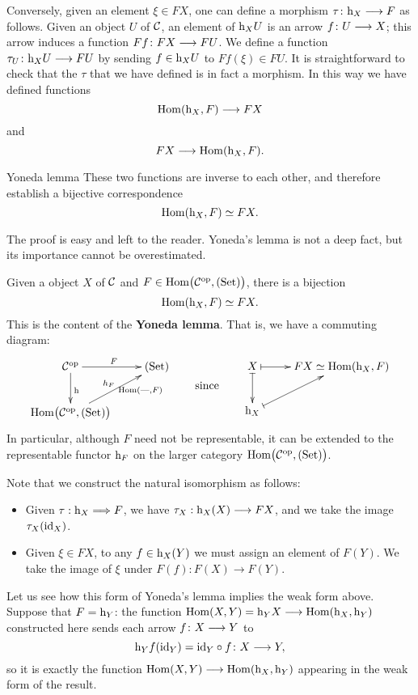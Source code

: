 \begin{2   CONTRAVARIANT FUNCTORS}
\begin{2.1 Yoneda Lemma}
Conversely, given an element $\xi\in F X$, one can define a morphism $\tau\colon \h_X \arr F$ as follows. Given an object $U$ of $\mathcal{C}$, an element of $\mathrm{h}_X U$ is an arrow $f\colon U \arr X$; this arrow induces a function $F f \colon F X \arr F U$. We define a function $\tau_{U} \colon \h_X U \arr F U$ by sending $f \in \mathrm{h}_X U$ to $F f(\xi) \in F U$. It is straightforward to check that the $\tau$ that we have defined is in fact a morphism. In this way we have defined functions
   \[
   \hom(\h_X,F) \arr F X
   \]
and
   \[
   F X \arr \hom(\h_X,F).
   \]

\begin{named}{Yoneda lemma}
These two functions are inverse to each other, and therefore establish a bijective correspondence
   \[
   \operatorname{Hom}(\mathrm{h}_X,F) \simeq F X.
   \]
\end{named}

The proof is easy and left to the reader. Yoneda's lemma is not a deep fact, but its importance cannot be overestimated.
\begin{shaded}
Given a object $X$ of $\mathcal{C}$ and $F\in\mathrm{Hom}\bigl(\mathcal{C}^{\mathrm{op}}, (\mathrm{Set})\bigr)$, there is a bijection
\[\operatorname{Hom}(\mathrm{h}_X,F)\simeq FX.\]
This is the content of the \textbf{Yoneda lemma}. That is, we have a commuting diagram:
\[\xymatrix{
\ar[d]^{\h}\calC\op\ar[r]^F&\catset\\
\func{\calC}\ar[ur]^{h_F}_(.65){\hom(\DASH,F)}&
}\raisebox{-6mm}{\qquad since\qquad }
\xymatrix{
\ar@{|->}[d]X\ar@{|->}[r]&FX\simeq\hom(\h_X,F)\\
\h_X\ar@{|->}[ur]
}\]
In particular, although $F$ need not be representable, it can be extended to the representable functor $\mathrm{h}_F$ on the larger category $\mathrm{Hom}\bigl(\mathcal{C}^{\mathrm{op}}, (\mathrm{Set})\bigr)$.

{\small Note that we construct the natural isomorphism as follows:
\begin{itemize}\squishlist
\item Given $\tau:\mathrm{h}_X\Longrightarrow F$, we have $\tau_X:\mathrm{h}_X(X)\longrightarrow FX$, and we take the image $\tau_X(\mathrm{id}_X)$.
\item Given $\xi\in F X$, to any $f\in \mathrm{h}_X(Y)$ we must assign an element of $F(Y)$. We take the image of $\xi$ under $F(f):F(X)\to F(Y)$.
\end{itemize}}

\end{shaded}

Let us see how this form of Yoneda's lemma implies the weak form above. Suppose that $F = \mathrm{h}_Y$: the function $\hom(X,Y) = \h_Y X \arr \hom(\h_X,\h_Y)$ constructed here sends each arrow $f \colon X \arr Y$ to
   \[
   \h_Y f(\id_Y) = \id_Y \circ f \colon X \arr Y,
   \]
so it is exactly the function $\hom(X,Y) \arr \hom(\h_X,\h_Y)$ appearing in the weak form of the result.


\end{2.1 Yoneda Lemma}
\end{2   CONTRAVARIANT FUNCTORS}

